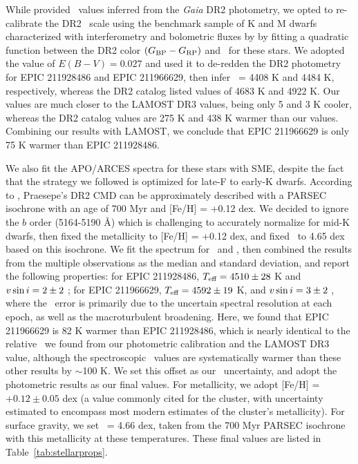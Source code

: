 While \citet{DR2prop} provided \teff\ values inferred from the 
\textit{Gaia} DR2 photometry, 
we opted to re-calibrate the DR2 \teff\ scale
using the benchmark sample of K and M dwarfs 
characterized with interferometry and 
bolometric fluxes by \citet{Boyajian2012} by 
fitting a quadratic function between 
the DR2 color $(G_{\rm BP} - G_{\rm RP})$ and \teff\ for these stars.
We adopted the \citet{Taylor2006} value of 
$E(B-V) = 0.027$ and used it to de-redden the DR2 photometry for EPIC 211928486 and EPIC 211966629, 
then infer \teff\ = 4408 K and 4484 K, respectively, 
whereas the DR2 catalog listed values of 4683 K and 4922 K.
Our values are much closer to the LAMOST DR3 values, 
being only 5 and 3 K cooler, 
whereas the DR2 catalog values are 
275 K and 438 K warmer than our values. 
Combining our results with LAMOST, 
we conclude that 
EPIC 211966629 is only 75 K warmer than EPIC 211928486. 

We also fit the APO/ARCES spectra for these stars with SME, 
despite the fact that the \citet{Valenti2005} strategy we followed 
is optimized for late-F to early-K dwarfs.
According to \citet{DR2HRD}, 
Praesepe's DR2 CMD can be approximately described with a PARSEC isochrone \citep{parsec, Marigo2017}
with an age of 700 Myr and [Fe/H] = +0.12 dex. 
We decided to ignore the  $b$ order (5164-5190 \AA) which is 
challenging to accurately normalize for mid-K dwarfs, 
then fixed the metallicity to [Fe/H] = +0.12 dex,
and fixed \logg\ to 4.65 dex based on this isochrone.
We fit the spectrum for \teff\ and \vsini, 
then combined the results from the multiple observations 
as the median and standard deviation, and report the following properties:
for EPIC 211928486,
$T_{\mbox{\scriptsize eff}} = 4510 \pm 28$ K and 
$v \sin i = 2 \pm 2$ \kms; 
for EPIC 211966629, 
$T_{\mbox{\scriptsize eff}} = 4592 \pm 19$ K, and 
$v \sin i = 3 \pm 2$ \kms,
where the \vsini\ error is primarily due 
to the uncertain spectral resolution at each epoch, 
as well as the macroturbulent broadening.
Here, we found that 
EPIC 211966629 is 82 K warmer than EPIC 211928486, 
which is nearly identical to the relative \teff\ 
we found from our photometric calibration and the LAMOST DR3 value, 
although the spectroscopic \teff\ values are systematically warmer 
than these other results by $\sim$100 K.
We set this offset as our \teff\ uncertainty, 
and adopt the photometric results as our final values.
For metallicity, 
we adopt [Fe/H] = $+0.12 \pm 0.05$ dex (a value commonly cited for the cluster, with uncertainty estimated to encompass most modern 
estimates of the cluster's metallicity).
For surface gravity, we set 
\logg\ = 4.66 dex,
taken from the 700 Myr PARSEC isochrone
with this metallicity at these temperatures.
These final values are listed in Table~\ref{tab:stellarprops}.

